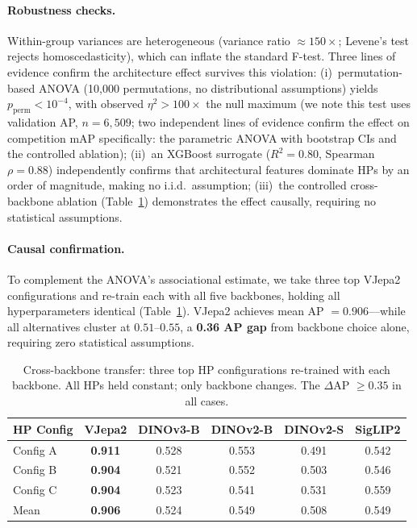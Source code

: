 \documentclass{article}
\begin{document}
\paragraph{Robustness checks.}
Within-group variances are heterogeneous (variance ratio $\approx 150\times$; Levene's test rejects homoscedasticity), which can inflate the standard F-test. Three lines of evidence confirm the architecture effect survives this violation:
(i)~permutation-based ANOVA (10{,}000 permutations, no distributional assumptions) yields $p_{\mathrm{perm}} < 10^{-4}$, with observed $\eta^2 > 100\times$ the null maximum (we note this test uses validation AP, $n = 6{,}509$; two independent lines of evidence confirm the effect on competition mAP specifically: the parametric ANOVA with bootstrap CIs and the controlled ablation);
(ii)~an XGBoost surrogate ($R^2 = 0.80$, Spearman $\rho = 0.88$) independently confirms that architectural features dominate HPs by an order of magnitude, making no i.i.d.\ assumption;
(iii)~the controlled cross-backbone ablation (Table~\ref{tab:xfer}) demonstrates the effect causally, requiring no statistical assumptions.

\paragraph{Causal confirmation.}
To complement the ANOVA's associational estimate, we take three top VJepa2 configurations and re-train each with all five backbones, holding all hyperparameters identical (Table~\ref{tab:xfer}). VJepa2 achieves mean AP $= 0.906$---while all alternatives cluster at $0.51$--$0.55$, a \textbf{0.36 AP gap} from backbone choice alone, requiring zero statistical assumptions.

\begin{table}[t]
\centering
\caption{Cross-backbone transfer: three top HP configurations re-trained with each backbone. All HPs held constant; only backbone changes. The $\Delta$AP $\geq 0.35$ in all cases.}
\label{tab:xfer}
\small
\begin{tabular}{@{}lccccc@{}}
\toprule
HP Config & VJepa2 & DINOv3-B & DINOv2-B & DINOv2-S & SigLIP2 \\
\midrule
Config A & \textbf{0.911} & 0.528 & 0.553 & 0.491 & 0.542 \\
Config B & \textbf{0.904} & 0.521 & 0.552 & 0.503 & 0.546 \\
Config C & \textbf{0.904} & 0.523 & 0.541 & 0.531 & 0.559 \\
\midrule
Mean & \textbf{0.906} & 0.524 & 0.549 & 0.508 & 0.549 \\
\bottomrule
\end{tabular}
\end{table}
\end{document}
